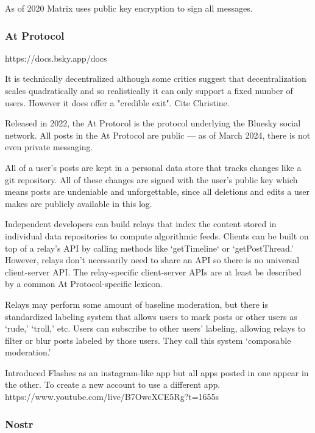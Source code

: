 
As of 2020 Matrix uses public key encryption to sign all messages.


\subsubsection{At Protocol}
https://docs.bsky.app/docs

It is technically decentralized although some critics suggest
that decentralization scales quadratically and so realistically it
can only support a fixed number of users.
However it does offer a "credible exit".
Cite Christine.

Released in 2022, the At Protocol is the protocol underlying the Bluesky social network.
All posts in the At Protocol are public --- as of March 2024, there is not even private messaging.

All of a user's posts are kept in a personal data store that tracks changes like a git repository. All of these changes are signed with the user's public key which means posts are undeniable and unforgettable, since all deletions and edits a user makes are publicly available in this log.

Independent developers can build relays that index the content stored in individual data repositories to compute algorithmic feeds. Clients can be built on top of a relay's API by calling methods like `getTimeline` or `getPostThread.' However, relays don't necessarily need to share an API so there is no universal client-server API.
The relay-specific client-server APIs are at least be described by a common At Protocol-specific lexicon.

Relays may perform some amount of baseline moderation, but there is standardized labeling system that allows users to mark posts or other users as `rude,' `troll,' etc.
Users can subscribe to other users' labeling, allowing relays to filter or blur posts labeled by those users.
They call this system `composable moderation.'

Introduced Flashes as an instagram-like app but all apps posted in one appear in the other.
To create a new account to use a different app.
https://www.youtube.com/live/B7OwcXCE5Rg?t=1655s

\subsubsection{Nostr}

